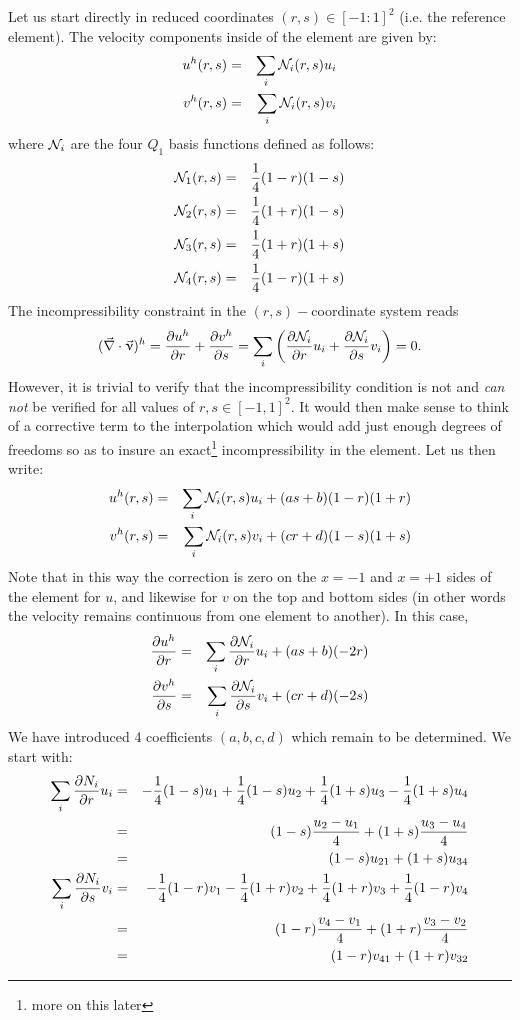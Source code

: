 Let us start directly in reduced coordinates $(r,s)\in [-1:1]^2$ (i.e. the reference element).
The velocity components inside of the element are given by:
\begin{eqnarray}
u^h(r,s)&=&\sum_i {\mathcal{N}}_i(r,s) u_i \nonumber\\
v^h(r,s)&=&\sum_i {\mathcal{N}}_i(r,s) v_i \nonumber
\end{eqnarray}
where ${\mathcal{N}}_i$ are the four $Q_1$ basis functions defined as follows:
\begin{eqnarray}
{\mathcal{N}}_1(r,s)&=& \frac{1}{4}(1-r)(1-s)  \nonumber\\ 
{\mathcal{N}}_2(r,s)&=& \frac{1}{4}(1+r)(1-s)  \nonumber\\ 
{\mathcal{N}}_3(r,s)&=& \frac{1}{4}(1+r)(1+s)  \nonumber\\ 
{\mathcal{N}}_4(r,s)&=& \frac{1}{4}(1-r)(1+s)  \nonumber
\end{eqnarray}
The incompressibility constraint in the $(r,s)-$coordinate system reads
\[
(\vec\nabla\cdot\vec\upnu)^h=
\frac{\partial u^h}{\partial r}+
\frac{\partial v^h}{\partial s}
=
\sum_i \left(  
\frac{\partial {\mathcal{N}}_i}{\partial r} u_i+
\frac{\partial {\mathcal{N}}_i}{\partial s} v_i
\right)
=0.
\]
However, it is trivial to verify that the incompressibility 
condition is not and \textit{can not} be verified for all values of  
$r,s \in [-1,1]^2$.
It would then make sense to think of a corrective term to the interpolation
which would add just enough degrees of freedoms so as to insure an exact\footnote{more
on this later} incompressibility in the element. 
Let us then write:
\begin{eqnarray}
u^h(r,s)&=&\sum_i {\mathcal{N}}_i(r,s) u_i + (a s + b)(1-r)(1+r) \nonumber\\
v^h(r,s)&=&\sum_i {\mathcal{N}}_i(r,s) v_i + (c r + d)(1-s)(1+s) \nonumber
\end{eqnarray}
Note that in this way the correction is zero on the $x=-1$ and $x=+1$ sides 
of the element for $u$, and likewise for $v$ on the top and bottom sides (in 
other words the velocity remains continuous from one element to another).
In this case,
\begin{eqnarray}
\frac{\partial u^h}{\partial r}&=&\sum_i \frac{\partial {\mathcal{N}}_i}{\partial r} u_i + (a s + b) (-2r) \nonumber\\
\frac{\partial v^h}{\partial s}&=&\sum_i \frac{\partial {\mathcal{N}}_i}{\partial s} v_i + (c r + d)(-2s) \nonumber
\end{eqnarray}
We have introduced 4 coefficients  $(a,b,c,d)$ which remain to be determined. 
We start with:
\begin{eqnarray}
\sum_i \frac{\partial N_i}{\partial r} u_i 
&=& -\frac{1}{4} (1-s) u_1 + \frac{1}{4} (1-s) u_2 +\frac{1}{4} (1+s) u_3 -\frac{1}{4} (1+s) u_4 \nonumber\\
&=& (1-s) \frac{u_2-u_1}{4} + (1+s) \frac{u_3-u_4}{4} \nonumber\\
&=& (1-s) u_{21} + (1+s) u_{34} \nonumber\\
\sum_i \frac{\partial N_i}{\partial s} v_i 
&=& -\frac{1}{4} (1-r) v_1 - \frac{1}{4} (1+r) v_2 +\frac{1}{4} (1+r) v_3 +\frac{1}{4} (1-r) v_4 \nonumber\\
&=& (1-r) \frac{v_4-v_1}{4} + (1+r)\frac{v_3-v_2}{4} \nonumber\\
&=& (1-r) v_{41} + (1+r) v_{32} \nonumber
\end{eqnarray}
